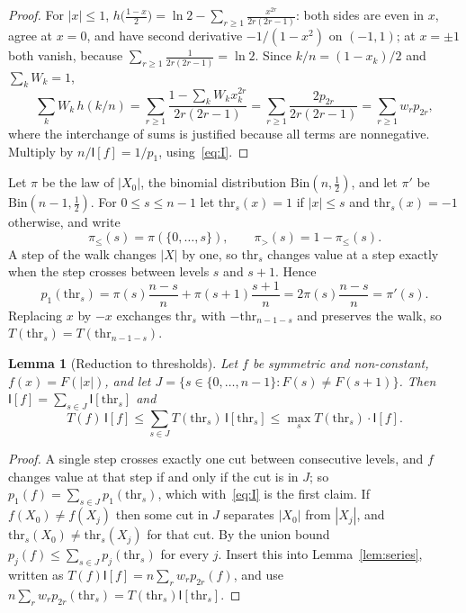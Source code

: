 \documentclass[11pt]{amsart}
\newtheorem{lemma}{Lemma}[section]
\theoremstyle{remark}
\newcommand{\I}{\mathsf I}
\newcommand{\thr}{\mathrm{thr}}
\begin{document}
\begin{proof}
For $|x|\le1$, $h\bigl(\frac{1-x}2\bigr)=\ln2-\sum_{r\ge1}\frac{x^{2r}}{2r(2r-1)}$: both sides are even in $x$, agree at $x=0$, and have second derivative $-1/(1-x^2)$ on $(-1,1)$; at $x=\pm1$ both vanish, because $\sum_{r\ge1}\frac1{2r(2r-1)}=\ln2$. Since $k/n=(1-x_k)/2$ and $\sum_kW_k=1$,
\[
 \sum_kW_k\,h(k/n)=\sum_{r\ge1}\frac{1-\sum_kW_kx_k^{2r}}{2r(2r-1)}=\sum_{r\ge1}\frac{2p_{2r}}{2r(2r-1)}=\sum_{r\ge1}w_rp_{2r},
\]
where the interchange of sums is justified because all terms are nonnegative. Multiply by $n/\I[f]=1/p_1$, using~\eqref{eq:I}.
\end{proof}

Let $\pi$ be the law of $|X_0|$, the binomial distribution $\mathrm{Bin}(n,\frac12)$, and let $\pi'$ be $\mathrm{Bin}(n-1,\frac12)$. For $0\le s\le n-1$ let $\thr_s(x)=1$ if $|x|\le s$ and $\thr_s(x)=-1$ otherwise, and write
\[
 \pi_{\le}(s)=\pi(\{0,\dots,s\}),\qquad \pi_{>}(s)=1-\pi_{\le}(s).
\]
A step of the walk changes $|X|$ by one, so $\thr_s$ changes value at a step exactly when the step crosses between levels $s$ and $s+1$. Hence
\begin{equation}\label{eq:p1}
 p_1(\thr_s)=\pi(s)\frac{n-s}n+\pi(s+1)\frac{s+1}n=2\pi(s)\frac{n-s}{n}=\pi'(s).
\end{equation}
Replacing $x$ by $-x$ exchanges $\thr_s$ with $-\thr_{n-1-s}$ and preserves the walk, so $T(\thr_s)=T(\thr_{n-1-s})$.

\begin{lemma}[Reduction to thresholds]\label{lem:reduction}
Let $f$ be symmetric and non-constant, $f(x)=F(|x|)$, and let $J=\{s\in\{0,\dots,n-1\}:F(s)\ne F(s+1)\}$. Then $\I[f]=\sum_{s\in J}\I[\thr_s]$ and
\[
 T(f)\,\I[f]\le\sum_{s\in J}T(\thr_s)\,\I[\thr_s]\le\max_sT(\thr_s)\cdot\I[f].
\]
\end{lemma}

\begin{proof}
A single step crosses exactly one cut between consecutive levels, and $f$ changes value at that step if and only if the cut is in $J$; so $p_1(f)=\sum_{s\in J}p_1(\thr_s)$, which with~\eqref{eq:I} is the first claim. If $f(X_0)\ne f(X_j)$ then some cut in $J$ separates $|X_0|$ from $|X_j|$, and $\thr_s(X_0)\ne\thr_s(X_j)$ for that cut. By the union bound $p_j(f)\le\sum_{s\in J}p_j(\thr_s)$ for every $j$. Insert this into Lemma~\ref{lem:series}, written as $T(f)\I[f]=n\sum_rw_rp_{2r}(f)$, and use $n\sum_rw_rp_{2r}(\thr_s)=T(\thr_s)\I[\thr_s]$.
\end{proof}
\end{document}
